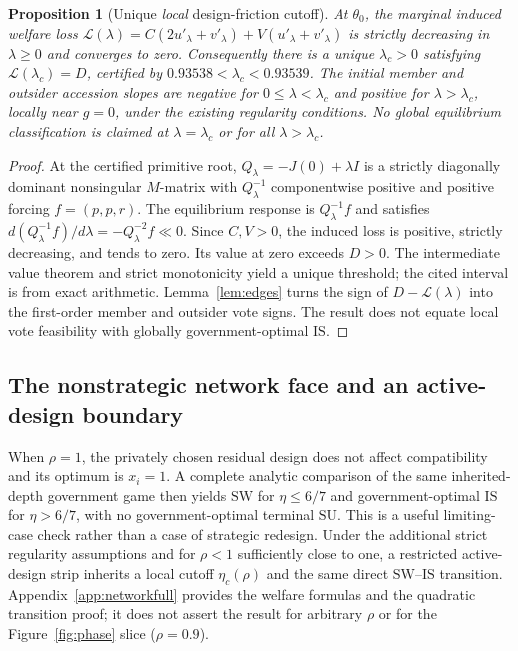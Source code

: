 \documentclass[11pt,a4paper]{article}
\newtheorem{proposition}[theorem]{Proposition}
\theoremstyle{remark}\newtheorem{remark}[theorem]{Remark}
\newcommand{\SW}{\mathrm{SW}}\newcommand{\SU}{\mathrm{SU}}\newcommand{\IS}{\mathrm{IS}}
\newcommand{\loss}{\mathcal L}\newcommand{\vect}[1]{\boldsymbol{#1}}
\begin{document}
\begin{proposition}[Unique \emph{local} design-friction cutoff]\label{prop:lambda}
At $\theta_0$, the marginal induced welfare loss $\loss(\lambda)=C(2u'_\lambda+v'_\lambda)+V(u'_\lambda+v'_\lambda)$ is strictly decreasing in $\lambda\ge0$ and converges to zero. Consequently there is a unique $\lambda_c>0$ satisfying $\loss(\lambda_c)=D$, certified by $0.93538<\lambda_c<0.93539$. The initial member and outsider accession slopes are negative for $0\le\lambda<\lambda_c$ and positive for $\lambda>\lambda_c$, locally near $g=0$, under the existing regularity conditions. No global equilibrium classification is claimed at $\lambda=\lambda_c$ or for all $\lambda>\lambda_c$.
\end{proposition}
\begin{proof}
At the certified primitive root, $Q_\lambda=-J(0)+\lambda I$ is a strictly diagonally dominant nonsingular $M$-matrix with $Q_\lambda^{-1}$ componentwise positive and positive forcing $f=(p,p,r)$. The equilibrium response is $Q_\lambda^{-1}f$ and satisfies $d(Q_\lambda^{-1}f)/d\lambda=-Q_\lambda^{-2}f\ll0$. Since $C,V>0$, the induced loss is positive, strictly decreasing, and tends to zero. Its value at zero exceeds $D>0$. The intermediate value theorem and strict monotonicity yield a unique threshold; the cited interval is from exact arithmetic. Lemma~\ref{lem:edges} turns the sign of $D-\loss(\lambda)$ into the first-order member and outsider vote signs. The result does not equate local vote feasibility with globally government-optimal $\IS$.
\end{proof}

\subsection{The nonstrategic network face and an active-design boundary}
When $\rho=1$, the privately chosen residual design does not affect compatibility and its optimum is $x_i=1$. A complete analytic comparison of the same inherited-depth government game then yields $\SW$ for $\eta\le6/7$ and government-optimal $\IS$ for $\eta>6/7$, with no government-optimal terminal $\SU$. This is a useful limiting-case check rather than a case of strategic redesign. Under the additional strict regularity assumptions and for $\rho<1$ sufficiently close to one, a restricted active-design strip inherits a local cutoff $\eta_c(\rho)$ and the same direct $\SW$--$\IS$ transition. Appendix~\ref{app:networkfull} provides the welfare formulas and the quadratic transition proof; it does not assert the result for arbitrary $\rho$ or for the Figure~\ref{fig:phase} slice ($\rho=0.9$).
\end{document}
